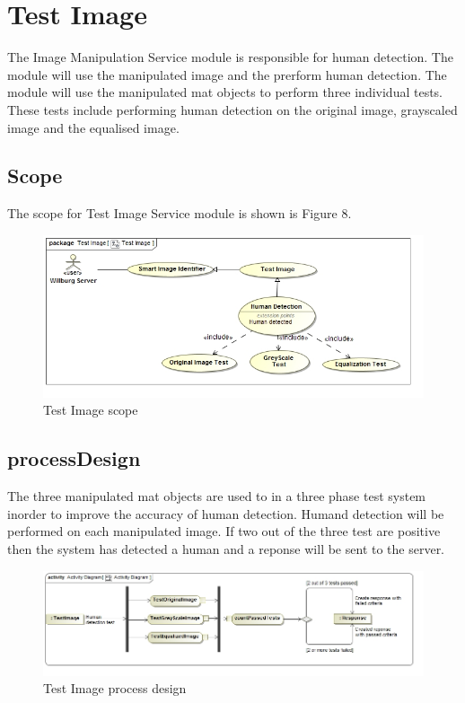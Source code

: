 \documentclass[a4paper,12pt]{report}
\begin{document}
	\newpage
	\section {Test Image}
		The Image Manipulation Service module is responsible for human detection. The module will use the manipulated image and the prerform human detection. The module will use the manipulated mat objects to perform three individual tests. These tests include performing human detection on the original image, grayscaled image and the equalised image.
		\subsection {Scope}
			The scope for Test Image Service module is shown is Figure 8.
			\begin{figure}[htb]
				\centering
				\includegraphics [scale=0.5]{../Diagrams/TestImage_Scope.jpg}
				\caption{Test Image scope}
			\end{figure}	
			\FloatBarrier
		
		\subsection {processDesign}
			The three manipulated mat objects are used to in a three phase test system inorder to improve the accuracy of human detection. Humand detection will be performed on each manipulated image. If two out of the three test are positive then the system has detected a human and a reponse will be sent to the server.
			\FloatBarrier
			\begin{figure}[htb]
				\centering
				\includegraphics [scale=0.5]{../Diagrams/TestImage_ActivityDiagram.jpg}
				\caption{Test Image process design}
			\end{figure}	
			\FloatBarrier
\end{document}
